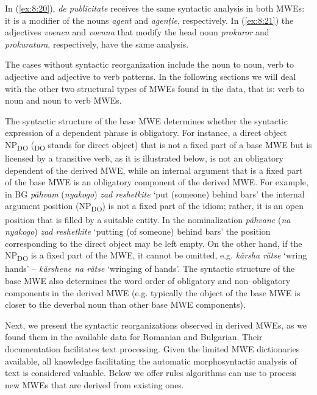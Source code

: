 \documentclass[output=paper]{langsci/langscibook}
\begin{document}
In (\ref{ex:8:20}), \textit{de publicitate} receives the same syntactic analysis in both
MWEs: it is a modifier of the nouns \textit{agent} and \textit{agenție},
respectively. In (\ref{ex:8:21}) the adjectives \textit{voenen} and \textit{voenna} that modify
the head noun \textit{prokuror} and \textit{prokuratura}, respectively, have the same
analysis. 



The cases without syntactic reorganization include the noun to noun,
verb to adjective and adjective to verb patterns. In the following
sections we will deal with the other two structural types of MWEs found
in the data, that is: verb to noun and noun to verb MWEs.



The syntactic structure of the base MWE determines whether the syntactic
expression of a dependent phrase is obligatory. For instance, a direct
object NP\textsubscript{DO} (\textsubscript{DO }stands for direct
object) that is not a fixed part of a base MWE but is licensed by a
transitive verb, as it is illustrated below, is not an obligatory
dependent of the derived MWE, while an internal argument that is a
fixed part of the base MWE is an obligatory component of the derived
MWE. For example, in BG \textit{păhvam} (\textit{nyakogo}) \textit{zad reshetkite} ‘put (someone)
behind bars’ the internal argument position (NP\textsubscript{DO}) is
not a fixed part of the idiom; rather, it is an open position that is
filled by a suitable entity. In the nominalization \textit{păhvane} (\textit{na
nyakogo}) \textit{zad reshetkite} ‘putting (of someone) behind bars’ the position
corresponding to the direct object may be left empty. On the other
hand, if the NP\textsubscript{DO} is a fixed part of the MWE, it cannot
be omitted, e.g. \textit{kărsha rătse} ‘wring hands’ – \textit{kărshene na rătse}
‘wringing of hands’. The syntactic structure of the base MWE also
determines the word order of obligatory and non–obligatory components
in the derived MWE (e.g. typically the object of the base MWE is closer
to the deverbal noun than other base MWE components).



Next, we present the syntactic reorganizations observed in derived MWEs,
as we found them in the available data for Romanian and Bulgarian.
Their documentation facilitates text processing. Given the limited MWE
dictionaries available, all knowledge facilitating the automatic
morphosyntactic analysis of text is considered valuable. Below we offer
rules algorithms can use to process new MWEs that are derived from
existing ones.
\end{document}
